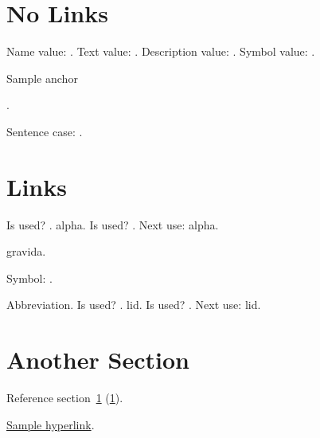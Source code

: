 \documentclass{article}
\begin{document}
\tableofcontents

\printunsrtglossaries

\section{No Links}
\label{sec:nolinks}
Name value: .
Text value: .
Description value: .
Symbol value: .

\hypertarget{sampleanchor}{Sample anchor}.

Sentence case: .

\section{Links}
\label{sec:links}

Is used? .
\gls{alpha}.
Is used? .
Next use: \gls{alpha}.

\Gls{gravida}.

Symbol: .

Abbreviation. 
Is used? .
\gls{lid}.
Is used? .
Next use: \gls{lid}.

\section{Another Section}
\label{sec:another}

Reference section~\ref{sec:nolinks} (\ref*{sec:nolinks}).

\hyperlink{sampleanchor}{Sample hyperlink}.

\lipsum
\end{document}

